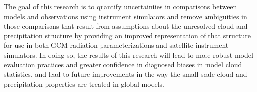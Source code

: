 \documentclass{article}
\begin{document}


The goal of this research is to quantify uncertainties in comparisons between models and observations using instrument simulators and remove ambiguities in those comparisons that result from assumptions about the unresolved cloud and precipitation structure by providing an improved representation of that structure for use in both GCM radiation parameterizations and satellite instrument simulators. In doing so, the results of this research will lead to more robust model evaluation practices and greater confidence in diagnosed biases in model cloud statistics, and lead to future improvements in the way the small-scale cloud and precipitation properties are treated in global models.
\end{document}
